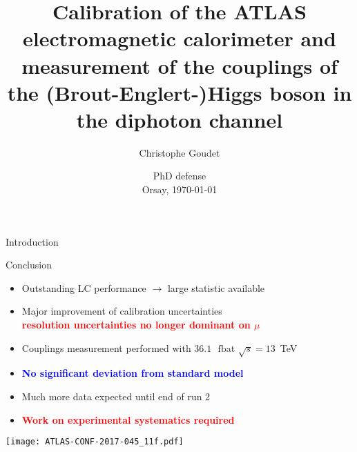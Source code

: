 \documentclass[a4paper]{beamer}
\title[Energy calibration \& Higgs couplings]{Calibration of the ATLAS electromagnetic calorimeter and measurement of the couplings of the (Brout-Englert-)Higgs boson in the diphoton channel}
\author[Goudet]{Christophe Goudet}
\institute[LAL]{\texttt{[image: LAL.jpg]} }
\date[Orsay, \today]{PhD defense \\ Orsay, \today}
\newcommand{\fb}{\ensuremath{\,\text{fb}}}
\begin{document}
\transboxin
\begin{frame}
\maketitle
\end{frame}

\begin{frame}{Introduction}
\tableofcontents
\end{frame}





\begin{frame}{Conclusion}

  \begin{itemize}
  \item Outstanding LC performance $\rightarrow$ large statistic available
  \item Major improvement of calibration uncertainties \\
    \textcolor{red}{\bf resolution uncertainties no longer dominant on $\mu$}
  \item Couplings measurement performed with $36.1$~\fb at $\sqrt{s}=13$~TeV
  \item \textcolor{blue}{\bf No significant deviation from standard model}
    \end{itemize}

  \begin{minipage}{0.39\linewidth}
    \begin{itemize}
    \item Much more data expected until end of run 2
    \item \textcolor{red}{\bf Work on experimental systematics required}
    \end{itemize}
  \end{minipage}
  \begin{minipage}{0.6\linewidth}
    \texttt{[image: ATLAS-CONF-2017-045\_11f.pdf]}
  \end{minipage}
\end{frame}

\begin{frame}
\maketitle
\end{frame}
\appendix



\end{document}
